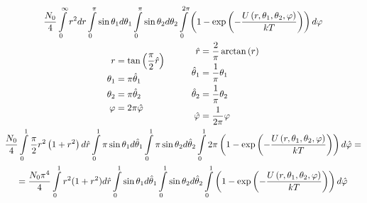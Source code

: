 \documentclass[12pt]{article}
\newcommand{\lb}{\left(}
\newcommand{\rb}{\right)}
\newcommand{\intty}{\int\limits}
\begin{document}
\begin{gather}
	\frac{N_0}{4} \intty_0^\infty r^2 dr \intty_0^\pi \sin \theta_1 d \theta_1 \intty_0^\pi \sin \theta_2 d \theta_2 \intty_0^{2 \pi} \lb 1 - \exp \lb - \frac{U \lb r, \theta_1, \theta_2, \varphi \rb}{kT} \rb \rb d \varphi \notag \\
	\begin{aligned}
			r &= \tan \lb \frac{\pi}{2} \hat{r} \rb \\
			\theta_1 &= \pi \hat{\theta}_1 \\
			\theta_2 &= \pi \hat{\theta}_2 \\
			\varphi &= 2 \pi \hat{\varphi}
	\end{aligned} \quad \quad \quad 
	\begin{aligned}
			\hat{r} &= \frac{2}{\pi} \arctan \lb r \rb \\
			\hat{\theta}_1 &= \frac{1}{\pi} \theta_1 \\
			\hat{\theta}_2 &= \frac{1}{\pi} \theta_2 \\
			\hat{\varphi} &= \frac{1}{2 \pi} \varphi
	\end{aligned}
	\notag \\
	\frac{N_0}{4} \intty_0^1 \frac{\pi}{2} r^2 \lb 1 + r^2 \rb d \hat{r} \intty_0^1 \pi \sin \theta_1 d \hat{\theta}_1 \intty_0^1 \pi \sin \theta_2 d \hat{\theta}_2 \intty_0^1 2 \pi \lb 1 - \exp \lb - \frac{U \lb r, \theta_1, \theta_2, \varphi \rb}{kT} \rb \rb d \hat{\varphi} = \notag \\
	= \frac{N_0 \pi^4}{4} \intty_0^1 r^2 (1 + r^2) d \hat{r} \intty_0^1 \sin \theta_1 d \hat{\theta}_1 \intty_0^1 \sin \theta_2 d \hat{\theta}_2 \intty_0^1 \lb 1 - \exp \lb - \frac{U \lb r, \theta_1, \theta_2, \varphi \rb}{kT} \rb \rb d \hat{\varphi} \notag
\end{gather}
\end{document}
